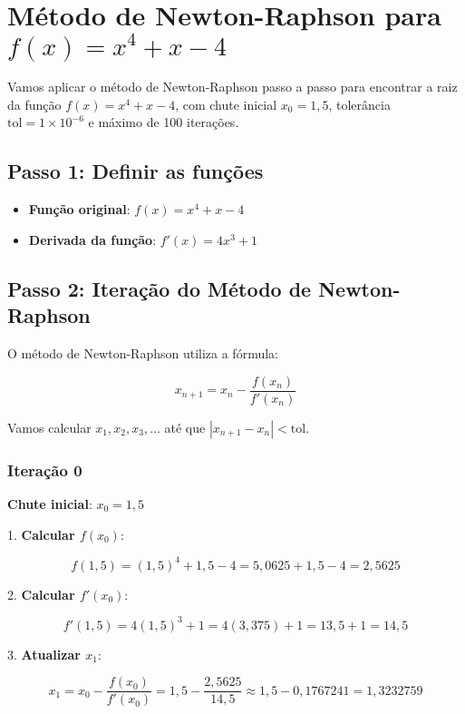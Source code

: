 \documentclass{article}
\begin{document}
\section*{Método de Newton-Raphson para $f(x) = x^4 + x - 4$}

Vamos aplicar o método de Newton-Raphson passo a passo para encontrar a raiz da função \( f(x) = x^4 + x - 4 \), com chute inicial \( x_0 = 1{,}5 \), tolerância \( \text{tol} = 1 \times 10^{-6} \) e máximo de 100 iterações.

\subsection*{Passo 1: Definir as funções}

\begin{itemize}
    \item \textbf{Função original}: \( f(x) = x^4 + x - 4 \)
    \item \textbf{Derivada da função}: \( f'(x) = 4x^3 + 1 \)
\end{itemize}

\subsection*{Passo 2: Iteração do Método de Newton-Raphson}

O método de Newton-Raphson utiliza a fórmula:

\[
x_{n+1} = x_n - \frac{f(x_n)}{f'(x_n)}
\]

Vamos calcular \( x_1, x_2, x_3, \ldots \) até que \( |x_{n+1} - x_n| < \text{tol} \).

\subsubsection*{Iteração 0}

\textbf{Chute inicial}: \( x_0 = 1{,}5 \)

1. \textbf{Calcular \( f(x_0) \)}:

\[
f(1{,}5) = (1{,}5)^4 + 1{,}5 - 4 = 5{,}0625 + 1{,}5 - 4 = 2{,}5625
\]

2. \textbf{Calcular \( f'(x_0) \)}:

\[
f'(1{,}5) = 4(1{,}5)^3 + 1 = 4(3{,}375) + 1 = 13{,}5 + 1 = 14{,}5
\]

3. \textbf{Atualizar \( x_1 \)}:

\[
x_1 = x_0 - \frac{f(x_0)}{f'(x_0)} = 1{,}5 - \frac{2{,}5625}{14{,}5} \approx 1{,}5 - 0{,}1767241 = 1{,}3232759
\]
\end{document}

